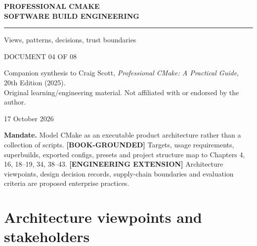 \documentclass[11pt,letterpaper,oneside]{report}
\begin{document}
\hypersetup{pageanchor=false}\begin{titlepage}
\color{navy}
\vspace*{1.15in}
{\Large\bfseries PROFESSIONAL CMAKE\\[7pt]SOFTWARE BUILD ENGINEERING\par}
\vspace{0.32in}\noindent\textcolor{teal}{\rule{0.9\linewidth}{2.3pt}}\par
\vspace{0.45in}
\par
\vspace{0.3in}
{\Large\color{teal}Views, patterns, decisions, trust boundaries\par}
\vfill
{\large DOCUMENT 04 OF 08\par}
\vspace{0.1in}
{\small Companion synthesis to Craig Scott, \emph{Professional CMake: A Practical Guide}, 20th Edition (2025).\\
Original learning/engineering material. Not affiliated with or endorsed by the author.\par}
\vspace{0.2in}
{\small 17 October 2026\par}
\end{titlepage}
\hypersetup{pageanchor=true}\clearpage{}\tableofcontents\clearpage{}

\textbf{Mandate.} Model CMake as an executable product architecture
rather than a collection of scripts. \textbf{{[}BOOK-GROUNDED{]}}
Targets, usage requirements, superbuilds, exported configs, presets and
project structure map to Chapters 4, 16, 18--19, 34, 38--43.
\textbf{{[}ENGINEERING EXTENSION{]}} Architecture viewpoints, design
decision records, supply-chain boundaries and evaluation criteria are
proposed enterprise practices.

\chapter{Architecture viewpoints and
stakeholders}\label{architecture-viewpoints-and-stakeholders}
\end{document}
